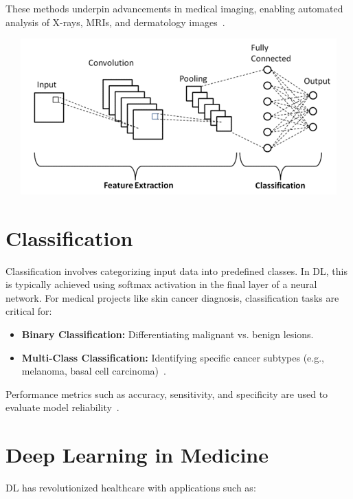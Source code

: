 \documentclass[a4paper,12pt]{report}
\begin{document}
\begin{spacing}{1.5}
\begin{itemize}
    These methods underpin advancements in medical imaging, enabling automated analysis of X-rays, MRIs, and dermatology images~\cite{dl5}.
    \end{itemize}
    \hspace{3cm}
    \begin{center}
        \includegraphics[width=14cm, height=6cm]{Pics/cnn1.png}
    \end{center}
    \hspace{1cm}
    \begin{minipage}[rH]{0.1\textwidth}
        \cite{cnnImg}    
    \end{minipage}

    \section{Classification}
    Classification involves categorizing input data into predefined classes. In DL, this is typically achieved using softmax activation in the final layer of a neural network. For medical projects like skin cancer diagnosis, classification tasks are critical for:
    \begin{itemize}
        \item \textbf{Binary Classification:} Differentiating malignant vs. benign lesions.
        \item \textbf{Multi-Class Classification:} Identifying specific cancer subtypes (e.g., melanoma, basal cell carcinoma)~\cite{dl6}.
    \end{itemize}
      Performance metrics such as accuracy, sensitivity, and specificity are used to evaluate model reliability~\cite{dl7}.
    
    \section{Deep Learning in Medicine}
    DL has revolutionized healthcare with applications such as:


\end{spacing}
\end{document}
